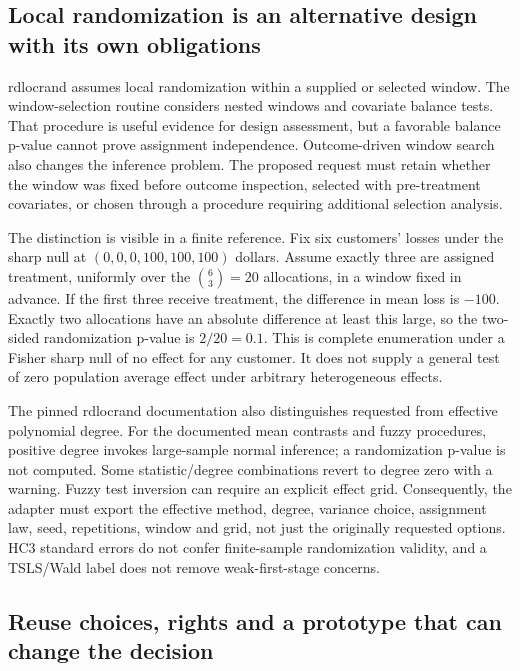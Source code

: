 \subsection{Local randomization is an alternative design with its own obligations}
\label{exec22:riv-randomization}

rdlocrand assumes local randomization within a supplied or selected window. The
window-selection routine considers nested windows and covariate balance tests.
That procedure is useful evidence for design assessment, but a favorable balance
p-value cannot prove assignment independence. Outcome-driven window search also
changes the inference problem. The proposed request must retain whether the window
was fixed before outcome inspection, selected with pre-treatment covariates, or
chosen through a procedure requiring additional selection analysis.
\citep{exec22_riv_rdlocrand}

The distinction is visible in a finite reference. Fix six customers' losses under
the sharp null at $(0,0,0,100,100,100)$ dollars. Assume exactly three are assigned
treatment, uniformly over the $\binom63=20$ allocations, in a window fixed in
advance. If the first three receive treatment, the difference in mean loss is
$-100$. Exactly two allocations have an absolute difference at least this large,
so the two-sided randomization p-value is $2/20=0.1$. This is complete enumeration
under a Fisher sharp null of no effect for any customer. It does not supply a
general test of zero population average effect under arbitrary heterogeneous
effects.~\citep{exec22_riv_reference}

The pinned rdlocrand documentation also distinguishes requested from effective
polynomial degree. For the documented mean contrasts and fuzzy procedures,
positive degree invokes large-sample normal inference; a randomization p-value
is not computed. Some statistic/degree combinations revert to degree zero with
a warning. Fuzzy test inversion can require an explicit effect grid. Consequently,
the adapter must export the effective method, degree, variance choice, assignment
law, seed, repetitions, window and grid, not just the originally requested
options. HC3 standard errors do not confer finite-sample randomization validity,
and a TSLS/Wald label does not remove weak-first-stage concerns.
\citep{exec22_riv_rdlocrand}

\subsection{Reuse choices, rights and a prototype that can change the decision}
\label{exec22:riv-reuse}

